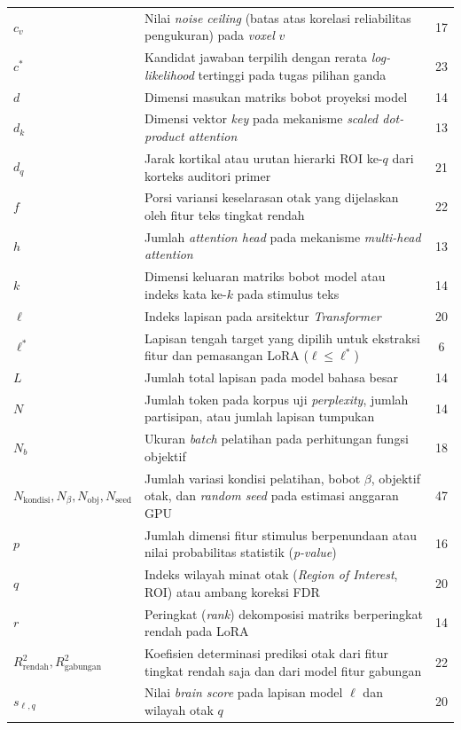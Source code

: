 \begin{longtable}{@{} l >{\raggedright\arraybackslash}p{6.5cm} c @{}}
$c_v$ & Nilai \textit{noise ceiling} (batas atas korelasi reliabilitas pengukuran) pada \textit{voxel} $v$ & 17 \\
$c^*$ & Kandidat jawaban terpilih dengan rerata \textit{log-likelihood} tertinggi pada tugas pilihan ganda & 23 \\
$d$ & Dimensi masukan matriks bobot proyeksi model & 14 \\
$d_k$ & Dimensi vektor \textit{key} pada mekanisme \textit{scaled dot-product attention} & 13 \\
$d_q$ & Jarak kortikal atau urutan hierarki ROI ke-$q$ dari korteks auditori primer & 21 \\
$f$ & Porsi variansi keselarasan otak yang dijelaskan oleh fitur teks tingkat rendah & 22 \\
$h$ & Jumlah \textit{attention head} pada mekanisme \textit{multi-head attention} & 13 \\
$k$ & Dimensi keluaran matriks bobot model atau indeks kata ke-$k$ pada stimulus teks & 14 \\
$\ell$ & Indeks lapisan pada arsitektur \textit{Transformer} & 20 \\
$\ell^*$ & Lapisan tengah target yang dipilih untuk ekstraksi fitur dan pemasangan LoRA ($\ell \le \ell^*$) & 6 \\
$L$ & Jumlah total lapisan pada model bahasa besar & 14 \\
$N$ & Jumlah token pada korpus uji \textit{perplexity}, jumlah partisipan, atau jumlah lapisan tumpukan & 14 \\
$N_b$ & Ukuran \textit{batch} pelatihan pada perhitungan fungsi objektif & 18 \\
$N_{\text{kondisi}}, N_\beta, N_{\text{obj}}, N_{\text{seed}}$ & Jumlah variasi kondisi pelatihan, bobot $\beta$, objektif otak, dan \textit{random seed} pada estimasi anggaran GPU & 47 \\
$p$ & Jumlah dimensi fitur stimulus berpenundaan atau nilai probabilitas statistik (\textit{p-value}) & 16 \\
$q$ & Indeks wilayah minat otak (\textit{Region of Interest}, ROI) atau ambang koreksi FDR & 20 \\
$r$ & Peringkat (\textit{rank}) dekomposisi matriks berperingkat rendah pada LoRA & 14 \\
$R^2_{\text{rendah}}, R^2_{\text{gabungan}}$ & Koefisien determinasi prediksi otak dari fitur tingkat rendah saja dan dari model fitur gabungan & 22 \\
$s_{\ell,q}$ & Nilai \textit{brain score} pada lapisan model $\ell$ dan wilayah otak $q$ & 20 \\

\end{longtable}
